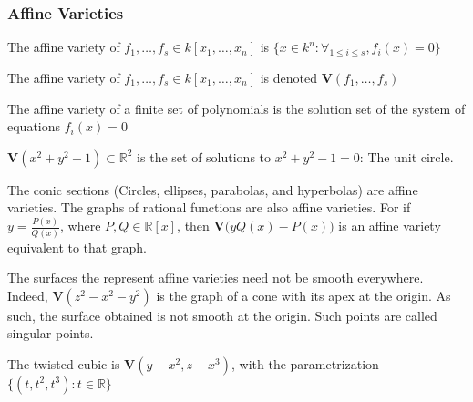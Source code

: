             \subsubsection{Affine Varieties}
                \begin{definition}
                    The affine variety of
                    $f_{1},\hdots,f_{s}\in{k}[x_{1},\hdots,x_{n}]$
                    is
                    $\{x\in{k^{n}}:\forall_{1\leq{i}\leq{s}},f_i(x)=0\}$
                \end{definition}
                \begin{notation}
                    The affine variety of
                    $f_{1},\hdots,f_{s}\in k[x_{1},\hdots,x_{n}]$
                    is denoted $\mathbf{V}(f_1,\hdots, f_s)$
                \end{notation}
                The affine variety of a finite set of
                polynomials is the solution set of the
                system of equations $f_{i}(x)=0$
                \begin{example}
                    $\mathbf{V}(x^2+y^2-1)\subset\mathbb{R}^2$
                    is the set of solutions to $x^2+y^2-1 = 0$: The unit circle.
                \end{example}
                \begin{example}
                    The conic sections
                    (Circles, ellipses, parabolas, and hyperbolas)
                    are affine varieties. The graphs of rational
                    functions are also affine varieties.
                    For if $y = \frac{P(x)}{Q(x)}$, where
                    $P,Q\in \mathbb{R}[x]$, then
                    $\mathbf{V}\big(yQ(x)-P(x)\big)$ is an
                    affine variety equivalent to that graph.
                \end{example}
                \begin{example}
                    The surfaces the represent affine varieties
                    need not be smooth everywhere. Indeed,
                    $\mathbf{V}(z^2-x^2-y^2)$ is the graph of a cone
                    with its apex at the origin. As such, the surface
                    obtained is not smooth at the origin. Such points
                    are called singular points.
                \end{example}
                \begin{example}
                    The twisted cubic is $\mathbf{V}(y-x^2,z-x^3)$,
                    with the parametrization $\{(t,t^2,t^3):t\in\mathbb{R}\}$
                \end{example}
